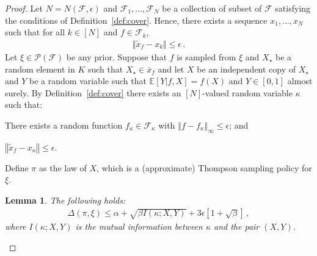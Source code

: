 \documentclass[letter, 12pt]{report}
\newcommand{\norm}[1]{\left \Vert  #1 \right \Vert}
\newcommand{\snorm}[1]{ \Vert  #1 \Vert}
\newcommand{\E}{\mathbb E}
\newcommand{\sF}{\mathscr F}
\newcommand{\sP}{\mathscr P}
\newcommand{\diam}{\operatorname{diam}}
\newcommand{\poly}{\operatorname{poly}}
\newcommand{\1}{\mathbf{1}}
\theoremstyle{plain}
\newtheorem{lemma}[theorem]{Lemma}
\theoremstyle{definition}
\theoremstyle{remark}
\begin{document}
\begin{proof}
    Let $N = N(\sF, \epsilon)$
    and $\sF_1,\ldots,\sF_N$ be a collection of subset of $\sF$ satisfying the conditions of Definition~\ref{def:cover}.
    Hence, there exists a sequence $x_1,\ldots,x_N$ such that for all $k \in [N]$ and $f \in \sF_k$,
    \begin{align*}
        \snorm{\tilde x_f - x_k} \leq \epsilon \,.
    \end{align*}
    Let $\xi \in \sP(\sF)$ be any prior.
    Suppose that $f$ is sampled from $\xi$ and $X_\star$ be a random element in $K$ such that $X_\star \in \bar x_f$ and let $X$ be an independent copy of $X_\star$
    and $Y$ be a random variable such that $\E[Y|f, X] = f(X)$ and $Y \in [0,1]$ almost surely.
    By Definition~\ref{def:cover} there exists an $[N]$-valued random variable $\kappa$ such that:
    \begin{enumroman}
        \item There exists a random function $f_\kappa \in \sF_\kappa$ with $\norm{f - f_\kappa}_\infty \leq \epsilon$; and \label{proof:ir:i}
        \item $\norm{\tilde x_f - x_\kappa} \leq \epsilon$. \label{proof:ir:ii}
    \end{enumroman}
    Define $\pi$ as the law of $X$, which is a (approximate) Thompson sampling policy for $\xi$.

    \begin{lemma}\label{lem:ir}
        The following holds:
        \begin{align*}
            \Delta(\pi, \xi) \leq \alpha + \sqrt{\beta I(\kappa ; X, Y)} + 3\epsilon[1 + \sqrt{\beta}] \,,
        \end{align*}
        where $I(\kappa ; X, Y)$ is the mutual information between $\kappa$ and the pair $(X, Y)$.
    \end{lemma}


\end{proof}
\end{document}
